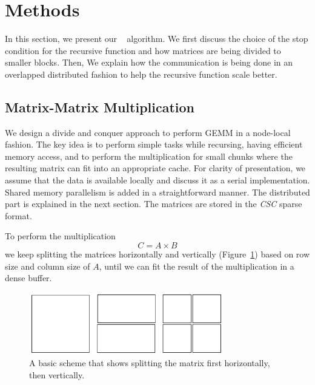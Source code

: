 \section{Methods}
\label{sec:methods}

In this section, we present our \mm~ algorithm. We first discuss the choice of the stop condition for the recursive function and how matrices are being divided to smaller blocks. Then, We explain how the communication is being done in an overlapped distributed fashion to help the recursive function scale better.


\subsection{Matrix-Matrix Multiplication}
\label{sec:matmult}

We design a divide and conquer approach to perform \textsc{GEMM} in a node-local fashion. The key idea is to perform simple tasks while recursing, having efficient memory access, and to perform the multiplication for small chunks where the resulting matrix can fit into an appropriate cache. For clarity of presentation, we assume that the data is available locally and discuss it as a serial implementation. Shared memory parallelism is added in a straightforward manner. The distributed part is explained in the next section. The matrices are stored in the \textit{CSC} sparse format.

To perform the multiplication
\begin{equation}
    C = A \times B
\end{equation}
we keep splitting the matrices horizontally and vertically (Figure~\ref{fig:split2}) based on row size and column size of $A$, until we can fit the result of the multiplication in a dense buffer.

\begin{figure}[tbh]
 \centering
 \includegraphics[width=8.5cm,height=2.7cm]{./figures/split2.pdf}
 \caption{A basic scheme that shows splitting the matrix first horizontally, then vertically.}
 \label{fig:split2}

\end{figure}


